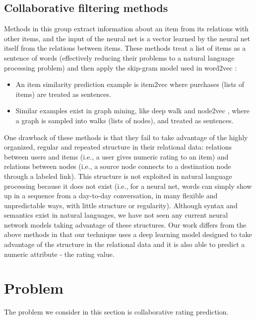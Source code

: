 \documentclass[12pt]{WSUThesis}
\theoremstyle{definition}
\begin{document}
\subsection{Collaborative filtering methods}
Methods in this group extract information about an item from its relations 
with other items, and the input of the neural net is a vector learned by the 
neural net itself from the relations between items.
These methods treat a list of items as a sentence of words 
(effectively reducing their problems to a natural language processing problem)  
and then apply the skip-gram model used in word2vec \cite{mikolov2013linguistic}:
\begin{itemize}
	\item An item similarity prediction example is item2vec 
	\cite{barkan2016item2vec} where purchases (lists of items) are 
	treated as sentences.
	\item Similar examples exist in graph mining, like deep walk 
	\cite{perozzi2014deepwalk} and node2vec \cite{grover2016node2vec}, 
	where a graph is sampled into walks (lists of nodes),
	and treated as sentences.
\end{itemize}
One drawback of these methods is that they fail to take advantage of 
the highly organized, regular and repeated structure in their relational data: 
relations between users and items (i.e., a user gives numeric rating to an 
item) and relations between nodes (i.e., a source node connects to a 
destination node through a labeled link).
This structure is not exploited in natural language processing because it 
does not exist (i.e., for a neural net, words can simply show up in a sequence 
from a day-to-day conversation, in many flexible and unpredictable ways, with 
little structure or regularity).
Although syntax and semantics exist in natural languages, we have not seen any 
current neural network models taking advantage of these structures.
Our work differs from the above methods in that our technique uses a 
deep learning model designed to take advantage of the structure in the 
relational data and it is also able to predict a numeric attribute - the rating 
value.

\section{Problem}
The problem we consider in this section is collaborative rating prediction.
\end{document}
